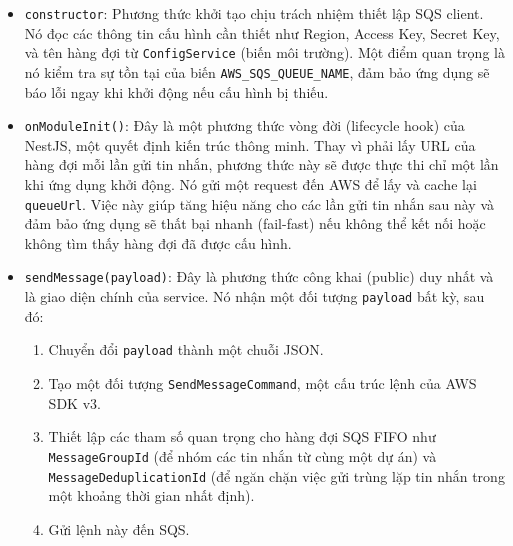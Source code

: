 \begin{itemize}
    \item \texttt{constructor}: Phương thức khởi tạo chịu trách nhiệm thiết lập SQS client. Nó đọc các thông tin cấu hình cần thiết như Region, Access Key, Secret Key, và tên hàng đợi từ \texttt{ConfigService} (biến môi trường). Một điểm quan trọng là nó kiểm tra sự tồn tại của biến \texttt{AWS\_SQS\_QUEUE\_NAME}, đảm bảo ứng dụng sẽ báo lỗi ngay khi khởi động nếu cấu hình bị thiếu.
    
    \item \texttt{onModuleInit()}: Đây là một phương thức vòng đời (lifecycle hook) của NestJS, một quyết định kiến trúc thông minh. Thay vì phải lấy URL của hàng đợi mỗi lần gửi tin nhắn, phương thức này sẽ được thực thi chỉ một lần khi ứng dụng khởi động. Nó gửi một request đến AWS để lấy và cache lại \texttt{queueUrl}. Việc này giúp tăng hiệu năng cho các lần gửi tin nhắn sau này và đảm bảo ứng dụng sẽ thất bại nhanh (fail-fast) nếu không thể kết nối hoặc không tìm thấy hàng đợi đã được cấu hình.
    
    \item \texttt{sendMessage(payload)}: Đây là phương thức công khai (public) duy nhất và là giao diện chính của service. Nó nhận một đối tượng \texttt{payload} bất kỳ, sau đó:
    \begin{enumerate}
        \item Chuyển đổi \texttt{payload} thành một chuỗi JSON.
        \item Tạo một đối tượng \texttt{SendMessageCommand}, một cấu trúc lệnh của AWS SDK v3.
        \item Thiết lập các tham số quan trọng cho hàng đợi SQS FIFO như \texttt{MessageGroupId} (để nhóm các tin nhắn từ cùng một dự án) và \texttt{MessageDeduplicationId} (để ngăn chặn việc gửi trùng lặp tin nhắn trong một khoảng thời gian nhất định).
        \item Gửi lệnh này đến SQS.
    \end{enumerate}
\end{itemize}